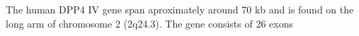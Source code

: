The human DPP4 IV gene span aproximately around 70 kb and is found on the long arm of chromosome 2 (2q24.3). The gene consists of 26 exons 